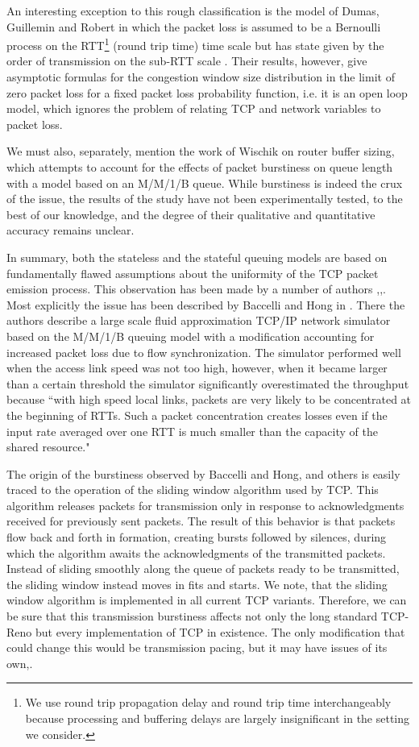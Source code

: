 \documentclass{IEEEtran}[10pt,letterpaper,conference]
\begin{document}
An interesting exception to this rough classification is the model of Dumas, Guillemin and Robert in which the packet loss is assumed to be a Bernoulli process on the RTT\footnote{We use round trip propagation delay and round trip time interchangeably because processing and buffering delays are largely insignificant in the setting we consider.} (round trip time) time scale but has state given by the order of transmission on the sub-RTT scale \cite{DumFabPhi}. Their results, however, give asymptotic formulas for the congestion window size distribution in the limit of zero packet loss for a fixed packet loss probability function, i.e. it is an open loop model, which ignores the problem of relating TCP and network variables to packet loss.

We must also, separately, mention the work of Wischik on router buffer sizing, which attempts to account for the effects of packet burstiness on queue length with a model based on an M/M/1/B queue\cite{Wis}. While burstiness is indeed the crux of the issue, the results of the study have not been experimentally tested, to the best of our knowledge, and the degree of their qualitative and quantitative accuracy remains unclear.

In summary, both the stateless and the stateful queuing models are based on fundamentally flawed assumptions about the uniformity of the TCP packet emission process. This observation has been made by a number of authors \cite{HuaLiuGonTow},\cite{GoeGau},\cite{GenMar}. Most explicitly the issue has been described by Baccelli and Hong in \cite{BacHon1}. There the authors describe a large scale fluid approximation TCP/IP network simulator based on the M/M/1/B queuing model with a modification accounting for increased packet loss due to flow synchronization. The simulator performed well when the access link speed was not too high, however, when it became larger than a certain threshold the simulator significantly overestimated the throughput because ``with high speed local links, packets are very likely to be concentrated at the beginning of RTTs. Such a packet concentration creates losses even if the input rate averaged over one RTT is much smaller than the capacity of the shared resource."\cite{BacHon1}

The origin of the burstiness observed by Baccelli and Hong, and others is easily traced to the operation of the sliding window algorithm used by TCP. This algorithm releases packets for transmission only in response to acknowledgments received for previously sent packets. The result of this behavior is that packets flow back and forth in formation, creating bursts followed by silences, during which the algorithm awaits the acknowledgments of the transmitted packets. Instead of sliding smoothly along the queue of packets ready to be transmitted, the sliding window instead moves in fits and starts. We note, that the sliding window algorithm is implemented in all current TCP variants. Therefore, we can be sure that this transmission burstiness affects not only the long standard TCP-Reno but every implementation of TCP in existence. The only modification that could change this would be transmission pacing, but it may have issues of its own\cite{Wis},\cite{Agg}.
\end{document}
